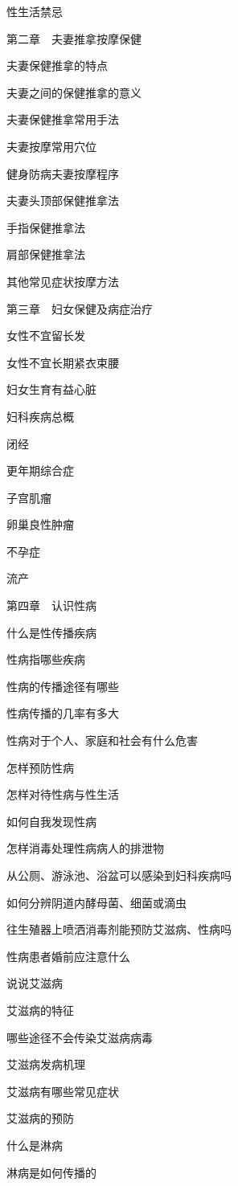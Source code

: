 \documentclass[12pt,UTF8]{ctexbook}
\begin{document}
性生活禁忌

第二章　夫妻推拿按摩保健

夫妻保健推拿的特点

夫妻之间的保健推拿的意义

夫妻保健推拿常用手法

夫妻按摩常用穴位

健身防病夫妻按摩程序

夫妻头顶部保健推拿法

手指保健推拿法

肩部保健推拿法

其他常见症状按摩方法

第三章　妇女保健及病症治疗

女性不宜留长发

女性不宜长期紧衣束腰

妇女生育有益心脏

妇科疾病总概

闭经

更年期综合症

子宫肌瘤

卵巢良性肿瘤

不孕症

流产

第四章　认识性病

什么是性传播疾病

性病指哪些疾病

性病的传播途径有哪些

性病传播的几率有多大

性病对于个人、家庭和社会有什么危害

怎样预防性病

怎样对待性病与性生活

如何自我发现性病

怎样消毒处理性病病人的排泄物

从公厕、游泳池、浴盆可以感染到妇科疾病吗

如何分辨阴道内酵母菌、细菌或滴虫

往生殖器上喷洒消毒剂能预防艾滋病、性病吗

性病患者婚前应注意什么

说说艾滋病

艾滋病的特征

哪些途径不会传染艾滋病病毒

艾滋病发病机理

艾滋病有哪些常见症状

艾滋病的预防

什么是淋病

淋病是如何传播的
\end{document}

